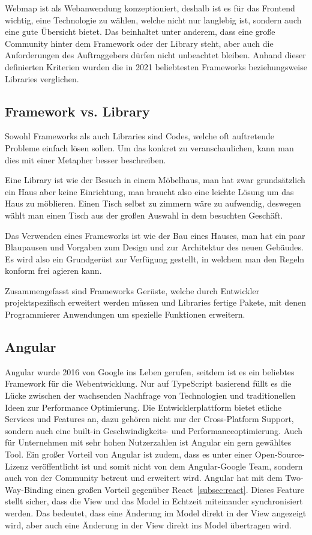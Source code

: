 Webmap ist als Webanwendung konzeptioniert, deshalb ist es für das Frontend wichtig, eine Technologie zu wählen, welche
nicht nur langlebig ist, sondern auch eine gute Übersicht bietet.
Das beinhaltet unter anderem, dass eine große Community hinter dem Framework oder der Library steht,
aber auch die Anforderungen des Auftraggebers dürfen nicht unbeachtet bleiben.
Anhand dieser definierten Kriterien wurden die in 2021 beliebtesten Frameworks beziehungsweise Libraries verglichen.

\subsection{Framework vs. Library}
\label{subsec:framework-versus-library}
Sowohl Frameworks als auch Libraries sind Codes, welche oft auftretende Probleme einfach lösen sollen.
Um das konkret zu veranschaulichen, kann man dies mit einer Metapher besser beschreiben.

Eine Library ist wie der Besuch in einem Möbelhaus, man hat zwar grundsätzlich ein Haus aber keine Einrichtung, man
braucht also eine leichte Lösung um das Haus zu möblieren.
Einen Tisch selbst zu zimmern wäre zu aufwendig, deswegen wählt man einen Tisch aus der großen Auswahl in dem besuchten Geschäft.

Das Verwenden eines Frameworks ist wie der Bau eines Hauses, man hat ein paar Blaupausen und Vorgaben zum Design und zur
Architektur des neuen Gebäudes.
Es wird also ein Grundgerüst zur Verfügung gestellt, in welchem man den Regeln konform frei agieren kann.

Zusammengefasst sind Frameworks Gerüste, welche durch Entwickler projektspezifisch erweitert werden müssen und Libraries
fertige Pakete, mit denen Programmierer Anwendungen um spezielle Funktionen erweitern.

\subsection{Angular}
\label{subsec:angular}
Angular wurde 2016 von Google ins Leben gerufen, seitdem ist es ein beliebtes Framework für die Webentwicklung.
Nur auf TypeScript basierend füllt es die Lücke zwischen der wachsenden Nachfrage von Technologien und traditionellen
Ideen zur Performance Optimierung.
Die Entwicklerplattform bietet etliche Services und Features an, dazu gehören nicht nur der Cross-Platform Support,
sondern auch eine built-in Geschwindigkeits- und Performanceoptimierung.
Auch für Unternehmen mit sehr hohen Nutzerzahlen ist Angular ein gern gewähltes Tool.
Ein großer Vorteil von Angular ist zudem, dass es unter einer Open-Source-Lizenz veröffentlicht
ist und somit nicht von dem Angular-Google Team, sondern auch von der Community betreut und erweitert wird.
Angular hat mit dem Two-Way-Binding einen großen Vorteil gegenüber React~\ref{subsec:react}.
Dieses Feature stellt sicher, dass die View und das Model in Echtzeit miteinander synchronisiert werden.
Das bedeutet, dass eine Änderung im Model direkt in der View angezeigt wird, aber auch eine Änderung in der View direkt
ins Model übertragen wird.
~\cite{angular-features,what-is-angular}


